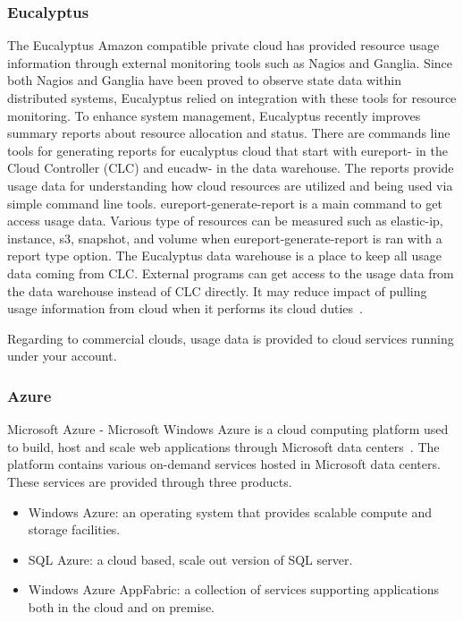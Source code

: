 \documentclass{sig-alternate-05-2015}
\begin{document}
\subsubsection{Eucalyptus}

The Eucalyptus Amazon compatible private cloud has provided resource usage information through external monitoring tools such as Nagios and Ganglia. Since both Nagios and Ganglia have been proved to observe state data within distributed systems, Eucalyptus relied on integration with these tools for resource monitoring. To enhance system management, Eucalyptus recently improves summary reports about resource allocation and status. There are commands line tools for generating reports for eucalyptus cloud that start with eureport- in the Cloud Controller (CLC) and eucadw- in the data warehouse. The reports provide usage data for understanding how cloud resources are utilized and being used via simple command line tools. eureport-generate-report is a main command to get access usage data. Various type of resources can be measured such as elastic-ip, instance, s3, snapshot, and volume when eureport-generate-report is ran with a report type option. The Eucalyptus data warehouse is a place to keep all usage data coming from CLC. External programs can get access to the usage data from the data warehouse instead of CLC directly. It may reduce impact of pulling usage information from cloud when it performs its cloud duties~\cite{Euca2ools14}.

Regarding to commercial clouds, usage data is provided to cloud services running under your account.

\subsubsection{Azure}

Microsoft Azure - Microsoft Windows Azure is a cloud computing platform used to build, host and scale web applications through Microsoft data centers~\cite{azure11}. The platform contains various on-demand services hosted in Microsoft data centers. These services are provided through three products.

\begin{itemize}
 \item Windows Azure: an operating system that provides scalable compute and storage facilities.
 \item SQL Azure: a cloud based, scale out version of SQL server.
 \item Windows Azure AppFabric: a collection of services supporting applications both in the cloud and on premise.
\end{itemize}
\end{document}
